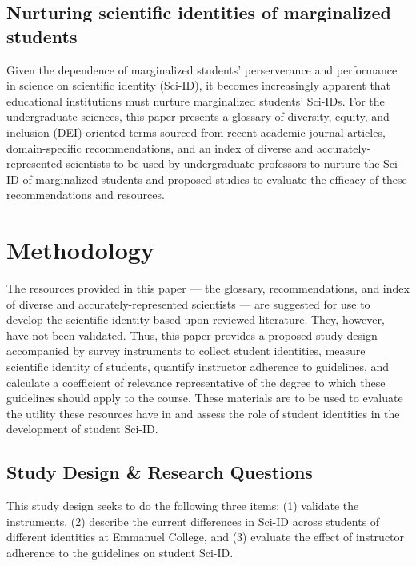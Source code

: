 \documentclass[10pt, twocolumn]{article}
\begin{document}
    \subsection{Nurturing scientific identities of marginalized students}
        
        Given the dependence of marginalized students' perserverance and performance in science on scientific identity (Sci-ID), it becomes increasingly apparent that educational institutions must nurture marginalized students' Sci-IDs. For the undergraduate sciences, this paper presents a glossary of diversity, equity, and inclusion (DEI)-oriented terms sourced from recent academic journal articles, domain-specific recommendations, and an index of diverse and accurately-represented scientists to be used by undergraduate professors to nurture the Sci-ID of marginalized students and proposed studies to evaluate the efficacy of these recommendations and resources. 

\section{Methodology}
        
    The resources provided in this paper --- the glossary, recommendations, and index of diverse and accurately-represented scientists --- are suggested for use to develop the scientific identity based upon reviewed literature. They, however, have not been validated. Thus, this paper provides a proposed study design accompanied by survey instruments to collect student identities, measure scientific identity of students, quantify instructor adherence to guidelines, and calculate a coefficient of relevance representative of the degree to which these guidelines should apply to the course. These materials are to be used to evaluate the utility these resources have in and assess the role of student identities in the development of student Sci-ID.

    \subsection{Study Design \& Research Questions}

        This study design seeks to do the following three items: (1) validate the instruments, (2) describe the current differences in Sci-ID across students of different identities at Emmanuel College, and (3) evaluate the effect of instructor adherence to the guidelines on student Sci-ID. 
\end{document}
